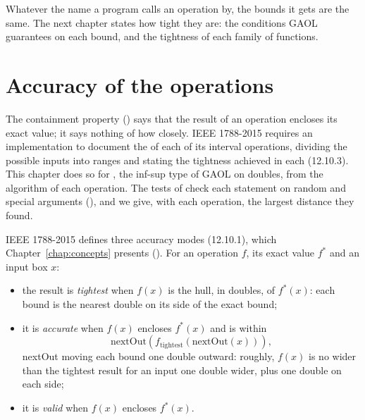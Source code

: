 \documentclass[12pt,a4paper,twoside,openright]{book}
\begin{document}
\medskip
Whatever the name a program calls an operation by, the bounds it gets are
the same. The next chapter states how tight they are: the conditions GAOL
guarantees on each bound, and the tightness of each family of functions.

\chapter{Accuracy of the operations}\label{chap:accuracy}
%

The containment property () says that the result of
an operation encloses its exact value; it says nothing of how closely.
IEEE 1788-2015 \cite{IEEE1788:2015} requires an implementation to document
the  of each of its interval operations, dividing the
possible inputs into ranges and stating the tightness achieved in each
(12.10.3). This chapter does so for , the inf-sup type of
GAOL on doubles, from the algorithm of each operation. The tests of
 check each statement on random and special arguments
(), and we give, with each operation, the largest
distance they found.\newinvfive

\medskip
IEEE 1788-2015 defines three accuracy modes (12.10.1), which
Chapter~\ref{chap:concepts} presents (). For an
operation $f$, its exact value $f^*$ and an input box $x$:
\begin{itemize}
\item the result is \emph{tightest} when $f(x)$ is the hull, in doubles, of
  $f^*(x)$: each bound is the nearest double on its side of the exact bound;
\item it is \emph{accurate} when $f(x)$ encloses $f^*(x)$ and is within
  \[\text{nextOut}(f_{\text{tightest}}(\text{nextOut}(x))),\]
  nextOut moving each bound one double outward: roughly, $f(x)$ is no wider
  than the tightest result for an input one double wider, plus one double on
  each side;
\item it is \emph{valid} when $f(x)$ encloses $f^*(x)$.
\end{itemize}
\end{document}
